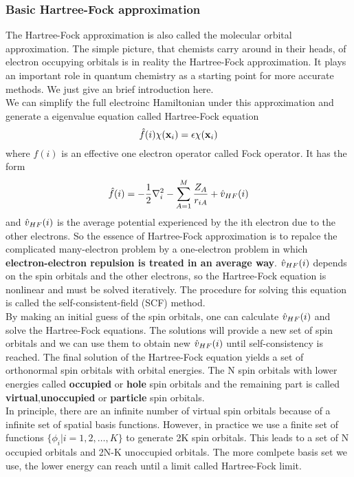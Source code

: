 \documentclass[11pt]{article}
\begin{document}
\subsubsection{Basic Hartree-Fock approximation}
The Hartree-Fock approximation is also called the molecular orbital approximation. The simple picture, that 
chemists carry around in their heads, of electron occupying orbitals is in reality the Hartree-Fock approximation.
It plays an important role in quantum chemistry as a starting point for more accurate methods. We just give an brief
introduction here.\\
We can simplify the full electroinc Hamiltonian under this approximation and generate a eigenvalue equation called
Hartree-Fock equation
\begin{equation}
    \Hat{f}(i)\chi(\mathbf{x}_i)=\epsilon\chi(\mathbf{x}_i)
\end{equation}
where $f(i)$ is an effective one electron operator called Fock operator. It has the form
\begin{equation}
    \Hat{f}(i)=-\frac{1}{2}\nabla_i^2-\sum_{A=1}^{M}\frac{Z_A}{r_{iA}}+\Hat{v}_{HF}(i)
\end{equation}
and $\Hat{v}_{HF}(i)$ is the average potential experienced by the ith electron due to the other
electrons. So the essence of Hartree-Fock approximation is to repalce the complicated many-electron
problem by a one-electron problem in which \textbf{electron-electron repulsion is treated in an average way}.
$\Hat{v}_{HF}(i)$ depends on the spin orbitals and the other electrons, so the Hartree-Fock equation
is nonlinear and must be solved iteratively. The procedure for solving this equation is called the
self-consistent-field (SCF) method.\\
By making an initial guess of the spin orbitals, one can calculate $\Hat{v}_{HF}(i)$ and solve the
Hartree-Fock equations. The solutions will provide a new set of spin orbitals and we can use them to obtain
new $\Hat{v}_{HF}(i)$ until self-consistency is reached. The final solution of the Hartree-Fock equation yields
a set of orthonormal spin orbitals with orbital energies. The N spin orbitals with lower energies called
\textbf{occupied} or \textbf{hole} spin orbitals and the remaining part is called \textbf{virtual},\textbf{unoccupied}
or \textbf{particle} spin orbitals.\\
In principle, there are an infinite number of virtual spin orbitals because of a infinite set of spatial basis
functions. However, in practice we use a finite set of functions $\{\phi_i|i=1,2,\ldots,K\}$ to generate 2K spin
orbitals. This leads to a set of N occupied orbitals and 2N-K unoccupied orbitals. The more comlpete basis set we
use, the lower energy can reach until a limit called Hartree-Fock limit.
\end{document}
